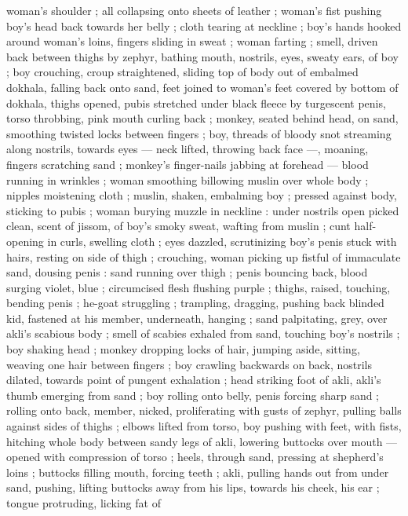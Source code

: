 woman's shoulder ; all collapsing onto sheets of leather ; woman's 
fist pushing boy's head back towards her belly ; cloth tearing at 
neckline ; boy's hands hooked around woman's loins, fingers sliding 
in sweat ; woman farting ; smell, driven back between thighs by 
zephyr, bathing mouth, nostrils, eyes, sweaty ears, of boy ; boy 
crouching, croup straightened, sliding top of body out of embalmed 
dokhala, falling back onto sand, feet joined to woman's feet covered 
by bottom of dokhala, thighs opened, pubis stretched under black 
fleece by turgescent penis, torso throbbing, pink mouth curling back 
; monkey, seated behind head, on sand, smoothing twisted locks 
between fingers ; boy, threads of bloody snot streaming along 
nostrils, towards eyes --- neck lifted, throwing back face ---, 
moaning, fingers scratching sand ; monkey's finger-nails jabbing at 
forehead --- blood running in wrinkles ; woman smoothing billowing 
muslin over whole body ; nipples moistening cloth ; muslin, shaken, 
embalming boy ; pressed against body, sticking to pubis ; woman 
burying muzzle in neckline : under nostrils open picked clean, scent 
of jissom, of boy's smoky sweat, wafting from muslin ; cunt half- 
opening in curls, swelling cloth ; eyes dazzled, scrutinizing boy's 
penis stuck with hairs, resting on side of thigh ; crouching, woman 
picking up fistful of immaculate sand, dousing penis : sand running 
over thigh ; penis bouncing back, blood surging violet, blue ; 
circumcised flesh flushing purple ; thighs, raised, touching, bending 
penis ; he-goat struggling ; trampling, dragging, pushing back 
blinded kid, fastened at his member, underneath, hanging ; sand 
palpitating, grey, over akli's scabious body ; smell of scabies exhaled 
from sand, touching boy's nostrils ; boy shaking head ; monkey 
dropping locks of hair, jumping aside, sitting, weaving one hair 
between fingers ; boy crawling backwards on back, nostrils dilated, 
towards point of pungent exhalation ; head striking foot of akli, akli's 
thumb emerging from sand ; boy rolling onto belly, penis forcing 
sharp sand ; rolling onto back, member, nicked, proliferating with 
gusts of zephyr, pulling balls against sides of thighs ; elbows lifted 
from torso, boy pushing with feet, with fists, hitching whole body 
between sandy legs of akli, lowering buttocks over mouth --- opened 
with compression of torso ; heels, through sand, pressing at 
shepherd's loins ; buttocks filling mouth, forcing teeth ; akli, pulling 
hands out from under sand, pushing, lifting buttocks away from his 
lips, towards his cheek, his ear ; tongue protruding, licking fat of 
